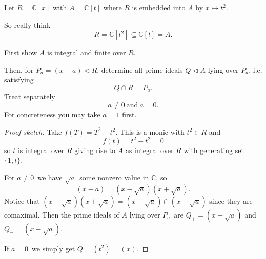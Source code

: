 \documentclass[11pt]{article}
\begin{document}
\begin{prob}
    Let $R = \mathbb C[x]$ 
    with $A = \mathbb C[t]$ 
    where $R$ is embedded into $A$ by 
    $x \mapsto t^2$. 

    So really think 
    \[
        R = \mathbb C[t^2] \subseteq 
        \mathbb C[t] = A. 
    \]

    First show $A$ is integral and finite over 
    $R$. 

    Then, for $P_a = (x-a) \triangleleft R$, 
    determine all prime ideals 
    $Q \triangleleft A$ lying over $P_a$, i.e. 
    satisfying 
    \[
        Q \cap R = P_a. 
    \]
    Treat separately 
    \[
        a \neq 0 \ \text{and} \ a = 0. 
    \]
    For concreteness you may take $a = 1$ first. 
\end{prob}
\begin{proof}[Proof sketch]
    Take $f(T) = T^2 - t^2$. This is a monic with 
    $t^2 \in R$ and 
    \[
        f(t) = t^2 - t^2 = 0
    \]
    so $t$ is integral over $R$ giving rise to 
    $A$ as integral over $R$ with generating set 
    $\{1,t\}$. 

    For $a \neq 0$ we have $\sqrt a$ some 
    nonzero value in $\mathbb C$, so 
    \[
        (x-a) = (x-\sqrt a)(x + \sqrt a). 
    \]
    Notice that $(x-\sqrt a)(x+\sqrt a) = (x-\sqrt a) \cap 
    (x+\sqrt a)$ since they are comaximal. 
    Then the prime ideals of $A$ lying over 
    $P_a$ are $Q_+ = (x + \sqrt a)$ and $Q_- = (x - \sqrt a)$. 

    If $a=0$ we simply get $Q = (t^2) = (x)$. 
\end{proof}
\end{document}
